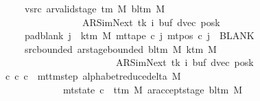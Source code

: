 \begin{isabellebody}
\ \ \ \ \ \ \ vsrc{\isacharcolon}{\kern0pt}\ {\isachardoublequoteopen}ar{\isacharunderscore}{\kern0pt}valid{\isacharunderscore}{\kern0pt}stage\ {\isacharparenleft}{\kern0pt}{\isasymGamma}{\isacharunderscore}{\kern0pt}tm\ M{\isacharparenright}{\kern0pt}\ {\isacharparenleft}{\kern0pt}bl{\isacharunderscore}{\kern0pt}tm\ M{\isacharparenright}{\kern0pt}\isanewline
\ \ \ \ \ \ \ \ \ \ \ \ \ \ \ \ \ \ \ {\isacharparenleft}{\kern0pt}AR{\isacharunderscore}{\kern0pt}SimNext{\isacharcomma}{\kern0pt}\ tk{\isacharcomma}{\kern0pt}\ i{\isacharcomma}{\kern0pt}\ buf{\isacharcomma}{\kern0pt}\ dvec{\isacharcomma}{\kern0pt}\ posk{\isacharparenright}{\kern0pt}{\isachardoublequoteclose}\isanewline
\ \ \ \ \ \ \ pad{\isacharunderscore}{\kern0pt}blank{\isacharcolon}{\kern0pt}\ {\isachardoublequoteopen}{\isasymforall}j\ {\isasymge}\ k{\isacharunderscore}{\kern0pt}tm\ M{\isachardot}{\kern0pt}\ mt{\isacharunderscore}{\kern0pt}tape\ c{\isacharprime}{\kern0pt}\ j\ {\isacharparenleft}{\kern0pt}mt{\isacharunderscore}{\kern0pt}pos\ c{\isacharprime}{\kern0pt}\ j{\isacharparenright}{\kern0pt}\ {\isacharequal}{\kern0pt}\ BLANK{}{\isachardoublequoteclose}\isanewline
\ \ \ \ \ \ \ src{\isacharunderscore}{\kern0pt}bounded{\isacharcolon}{\kern0pt}\ {\isachardoublequoteopen}ar{\isacharunderscore}{\kern0pt}stage{\isacharunderscore}{\kern0pt}bounded\ {\isacharparenleft}{\kern0pt}bl{\isacharunderscore}{\kern0pt}tm\ M{\isacharparenright}{\kern0pt}\ {\isacharparenleft}{\kern0pt}k{\isacharunderscore}{\kern0pt}tm\ M{\isacharparenright}{\kern0pt}\isanewline
\ \ \ \ \ \ \ \ \ \ \ \ \ \ \ \ \ \ \ \ \ \ \ \ \ \ {\isacharparenleft}{\kern0pt}AR{\isacharunderscore}{\kern0pt}SimNext{\isacharcomma}{\kern0pt}\ tk{\isacharcomma}{\kern0pt}\ i{\isacharcomma}{\kern0pt}\ buf{\isacharcomma}{\kern0pt}\ dvec{\isacharcomma}{\kern0pt}\ posk{\isacharparenright}{\kern0pt}{\isachardoublequoteclose}\isanewline
\ \ \ {\isachardoublequoteopen}{\isasymexists}c{\isacharprime}{\kern0pt}{\isacharprime}{\kern0pt}{\isachardot}{\kern0pt}\ {\isacharparenleft}{\kern0pt}c{\isacharprime}{\kern0pt}{\isacharcomma}{\kern0pt}\ c{\isacharprime}{\kern0pt}{\isacharprime}{\kern0pt}{\isacharparenright}{\kern0pt}\ {\isasymin}\ mttm{\isacharunderscore}{\kern0pt}step\ {\isacharparenleft}{\kern0pt}alphabet{\isacharunderscore}{\kern0pt}reduce{\isacharunderscore}{\kern0pt}delta\ M{\isacharparenright}{\kern0pt}\isanewline
\ \ \ \ \ \ \ \ \ \ \ \ \ \ {\isasymand}\ mt{\isacharunderscore}{\kern0pt}state\ c{\isacharprime}{\kern0pt}{\isacharprime}{\kern0pt}\ {\isacharequal}{\kern0pt}\ {\isacharparenleft}{\kern0pt}t{\isacharunderscore}{\kern0pt}tm\ M{\isacharcomma}{\kern0pt}\ ar{\isacharunderscore}{\kern0pt}accept{\isacharunderscore}{\kern0pt}stage\ {\isacharparenleft}{\kern0pt}bl{\isacharunderscore}{\kern0pt}tm\ M{\isacharparenright}{\kern0pt}{\isacharparenright}{\kern0pt}\isanewline

\end{isabellebody}
